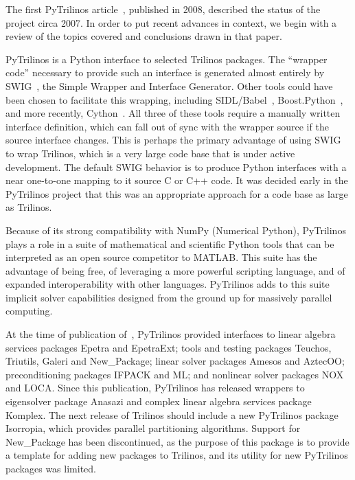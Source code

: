 \documentclass[11pt]{article}
\begin{document}
The first PyTrilinos article~\cite{PyTrilinos}, published in 2008, described the status of the project circa 2007.  In order to put recent advances in context, we begin with a review of the topics covered and conclusions drawn in that paper.

PyTrilinos is a Python interface to selected Trilinos packages.  The ``wrapper code'' necessary to provide such an interface is generated almost entirely by SWIG~\cite{SWIG_CXX_Python}, the Simple Wrapper and Interface Generator.  Other tools could have been chosen to facilitate this wrapping, including SIDL/Babel~\cite{Babel}, Boost.Python~\cite{BoostPython}, and more recently, Cython~\cite{Cython}.  All three of these tools require a manually written interface definition, which can fall out of sync with the wrapper source if the source interface changes.  This is perhaps the primary advantage of using SWIG to wrap Trilinos, which is a very large code base that is under active development.  The default SWIG behavior is to produce Python interfaces with a near one-to-one mapping to it source C or C++ code.  It was decided early in the PyTrilinos project that this was an appropriate approach for a code base as large as Trilinos.

Because of its strong compatibility with NumPy (Numerical Python), PyTrilinos plays a role in a suite of mathematical and scientific Python tools that can be interpreted as an open source competitor to MATLAB.  This suite has the advantage of being free, of leveraging a more powerful scripting language, and of expanded interoperability with other languages.  PyTrilinos adds to this suite implicit solver capabilities designed from the ground up for massively parallel computing.

At the time of publication of~\cite{PyTrilinos}, PyTrilinos provided interfaces to linear algebra services packages Epetra and EpetraExt; tools and testing packages Teuchos, Triutils, Galeri and New\_Package; linear solver packages Amesos and AztecOO; preconditioning packages IFPACK and ML; and nonlinear solver packages NOX and LOCA.  Since this publication, PyTrilinos has released wrappers to eigensolver package Anasazi and complex linear algebra services package Komplex.  The next release of Trilinos should include a new PyTrilinos package Isorropia, which provides parallel partitioning algorithms.  Support for New\_Package has been discontinued, as the purpose of this package is to provide a template for adding new packages to Trilinos, and its utility for new PyTrilinos packages was limited.
\end{document}
